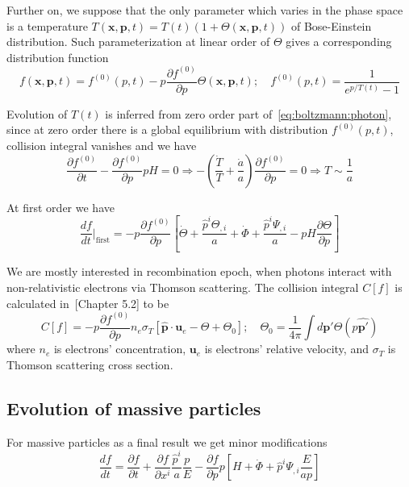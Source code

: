 \documentclass[12pt]{extarticle}
\numberwithin{problem}{section}
\numberwithin{theorem}{section}
\begin{document}
	Further on, we suppose that the only parameter which varies in the phase space is a temperature $T(\mathbf{x}, \mathbf{p}, t) = T(t)(1 + \Theta(\mathbf{x}, \mathbf{p}, t))$ of Bose-Einstein distribution. Such parameterization at linear order of $\Theta$ gives a corresponding distribution function
	\begin{equation}
		f(\mathbf{x}, \mathbf{p}, t) = f^{(0)}(p, t) - p\frac{\partial f^{(0)}}{\partial p}\Theta(\mathbf{x}, \mathbf{p}, t);\quad f^{(0)}(p, t) = \frac{1}{e^{p / T(t)} - 1}
	\end{equation} 

	Evolution of $T(t)$ is inferred from zero order part of~\ref{eq:boltzmann:photon}, since at zero order there is a global equilibrium with distribution $f^{(0)}(p, t)$, collision integral vanishes and we have
	\begin{equation}
		\frac{\partial f^{(0)}}{\partial t} - \frac{\partial f^{(0)}}{\partial p}pH = 0\Rightarrow -\left(\frac{\dot{T}}{T} + \frac{\dot{a}}{a}\right)\frac{\partial f^{(0)}}{\partial p} = 0\Rightarrow T\sim\frac{1}{a}
	\end{equation}

	At first order we have
	\begin{equation}
		\frac{df}{dt}\Big\lvert_{\text{first}} = -p\frac{\partial f^{(0)}}{\partial p}\left[\dot{\Theta} + \frac{\hat{p}^i\Theta_{,i}}{a} + \dot{\Phi} + \frac{\hat{p}^i\Psi_{,i}}{a} - pH\frac{\partial\Theta}{\partial p}\right]
	\end{equation}

	We are mostly interested in recombination epoch, when photons interact with non-relativistic electrons via Thomson scattering. The collision integral $C[f]$ is calculated in~\cite{dodelson:2003}[Chapter 5.2] to be
	\begin{equation}
		C[f] = -p\frac{\partial f^{(0)}}{\partial p}n_e\sigma_T\left[\mathbf{\hat{p}}\cdot\mathbf{u}_e - \Theta + \Theta_0\right];\quad \Theta_0 = \frac{1}{4\pi}\int d\mathbf{\hat{p'}}\Theta(p\mathbf{\hat{p'}})
	\end{equation}
	where $n_e$ is electrons' concentration, $\mathbf{u}_e$ is electrons' relative velocity, and $\sigma_T$ is Thomson scattering cross section.
	
	\subsection{Evolution of massive particles}
	For massive particles as a final result we get minor modifications
	\begin{equation}
		\frac{df}{dt} = \frac{\partial f}{\partial t} + \frac{\partial f}{\partial x^i}\frac{\hat{p}^i}{a}\frac{p}{E} - \frac{\partial f}{\partial p}p\left[H + \dot{\Phi} + \hat{p}^i\Psi_{,i} \frac{E}{ap}\right]
	\end{equation}
	
	
	
\end{document}
